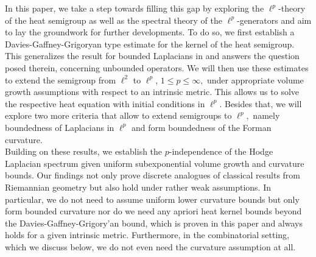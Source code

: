 \documentclass[10pt]{amsart}
\theoremstyle{definition}
\begin{document}
In this paper, we take a step towards filling this gap by exploring the $\ell^p$-theory of the heat semigroup as well as the spectral theory of the $\ell^p$-generators and aim to lay the groundwork for further developments. To do so, we first establish a Davies-Gaffney-Grigoryan type estimate for the kernel of the heat semigroup. This generalizes the result for bounded Laplacians in \cite{HL} and answers the question posed therein, concerning unbounded operators. We will then use these estimates to extend the semigroup from $\ell^2$ to $\ell^p$, $1\leq p\leq\infty,$ under appropriate volume growth assumptions with respect to an intrinsic metric. This allows us to solve the respective heat equation with initial conditions in $\ell^p.$ Besides that, we will explore two more criteria that allow to extend semigroups to $\ell^p,$ namely boundedness of Laplacians in $\ell^p$ and form boundedness of the Forman curvature.\\
 Building on these results, we establish the $p$-independence of the Hodge Laplacian spectrum given  uniform subexponential volume growth and curvature bounds. Our findings not only prove discrete analogues of  classical results from Riemannian geometry \cite{Braun,Ch, Sturm} but also hold under rather weak assumptions. In particular, we do not need to assume uniform lower curvature bounds but only form bounded curvature  nor do we need any apriori heat kernel bounds beyond the Davies-Gaffney-Grigory'an bound, which is proven in this paper and always holds for a given intrinsic metric. Furthermore, in the combinatorial setting, which we discuss below, we do not even need the curvature assumption at all.\\
\end{document}
